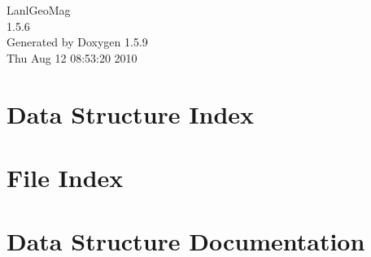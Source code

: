 \documentclass[a4paper]{book}
\begin{document}
\hypersetup{pageanchor=false}
\begin{titlepage}
\vspace*{7cm}
\begin{center}
{\Large LanlGeoMag \\[1ex]\large 1.5.6 }\\
\vspace*{1cm}
{\large Generated by Doxygen 1.5.9}\\
\vspace*{0.5cm}
{\small Thu Aug 12 08:53:20 2010}\\
\end{center}
\end{titlepage}
\clearemptydoublepage
{}
\tableofcontents
\clearemptydoublepage
{}
\hypersetup{pageanchor=true}
\chapter{Data Structure Index}

\chapter{File Index}

\chapter{Data Structure Documentation}



































\end{document}
